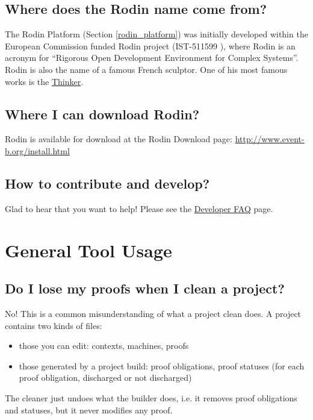 \subsection{Where does the Rodin name come from?}

The Rodin Platform (Section \ref{rodin_platform}) was initially developed within the European Commission funded Rodin project (IST-511599 ), where Rodin is an acronym for ``Rigorous Open Development Environment for Complex Systems”. Rodin is also the name of a famous French sculptor. One of his most famous works is the \href{http://en.wikipedia.org/wiki/The_Thinker}{Thinker}. 

\subsection{Where I can download Rodin?}
\label{faq_where_download_rodin}

Rodin is available for download at the Rodin Download page: \href{http://www.event-b.org/install.html}{http://www.event-b.org/install.html}

\subsection{How to contribute and develop?}

Glad to hear that you want to help!  Please see the \href{http://wiki.event-b.org/index.php/Developer_FAQ}{Developer FAQ} page.

\section{General Tool Usage}

\subsection{Do I lose my proofs when I clean a project?}
No! This is a common misunderstanding of what a project clean does. A project contains two kinds of files: 

\begin{itemize}
	\item those you can edit: contexts, machines, proofs 
	\item those generated by a project build: proof obligations, proof statuses (for each proof obligation, discharged or not discharged) 
\end{itemize}

The cleaner just undoes what the builder does, i.e. it removes proof obligations and statuses, but it never modifies any proof.

